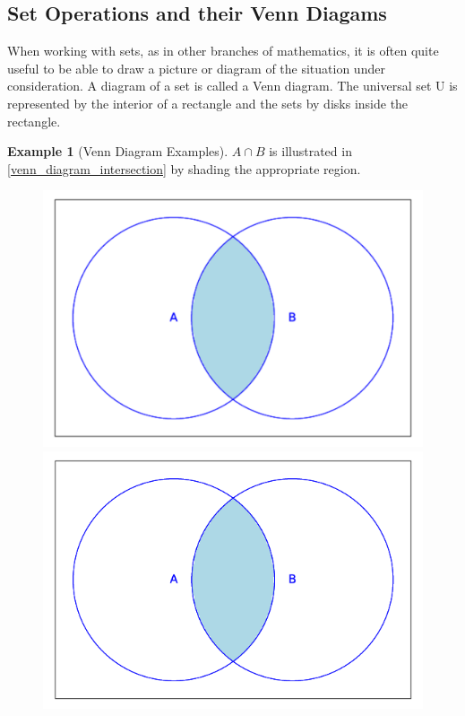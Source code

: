 \documentclass[10pt,]{book}
\theoremstyle{plain}
\theoremstyle{definition}
\theoremstyle{definition}
\theoremstyle{definition}
\newtheorem{example}[theorem]{Example}
\theoremstyle{definition}
\begin{document}
\subsection[Set Operations and their Venn Diagams ]{Set Operations and their Venn Diagams }\label{subsection-4}
When working with sets, as in other branches of mathematics, it is often quite useful to be able to draw a picture or diagram of the situation under consideration. A diagram of a set is called a Venn diagram. The universal set U is represented by the interior of a rectangle and the sets by disks inside the rectangle.%
\begin{example}[Venn Diagram Examples]\label{venn_diagram_examples}
 \(A \cap  B\) is illustrated in \hyperref[venn_diagram_intersection]{\ref{venn_diagram_intersection}} by shading the appropriate region.%
\leavevmode%
\begin{figure}
\centering
{}%
{\includegraphics[width=1\linewidth]{images/sageplot-venn-intersection.pdf}}%
{\includegraphics[width=1\linewidth]{images/sageplot-venn-intersection.png}}

\end{figure}
\end{example}
\end{document}
